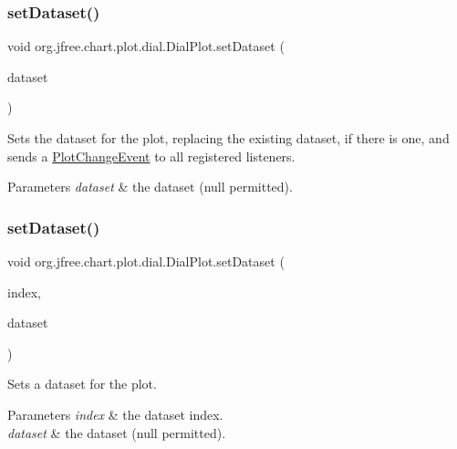 \subsubsection{\texorpdfstring{set\+Dataset()}{setDataset()}\hspace{0.1cm}{\footnotesize\ttfamily [1/2]}}
{\footnotesize\ttfamily void org.\+jfree.\+chart.\+plot.\+dial.\+Dial\+Plot.\+set\+Dataset (\begin{DoxyParamCaption}\item[{\mbox{\hyperlink{interfaceorg_1_1jfree_1_1data_1_1general_1_1_value_dataset}{Value\+Dataset}}}]{dataset }\end{DoxyParamCaption})}

Sets the dataset for the plot, replacing the existing dataset, if there is one, and sends a \mbox{\hyperlink{}{Plot\+Change\+Event}} to all registered listeners.


\begin{DoxyParams}{Parameters}
{\em dataset} & the dataset ({\ttfamily null} permitted). \\
\hline
\end{DoxyParams}
\mbox{\label{classorg_1_1jfree_1_1chart_1_1plot_1_1dial_1_1_dial_plot_acb78f99791020bfbf09b7e3e0c1dad45}} 
\subsubsection{\texorpdfstring{set\+Dataset()}{setDataset()}\hspace{0.1cm}{\footnotesize\ttfamily [2/2]}}
{\footnotesize\ttfamily void org.\+jfree.\+chart.\+plot.\+dial.\+Dial\+Plot.\+set\+Dataset (\begin{DoxyParamCaption}\item[{int}]{index,  }\item[{\mbox{\hyperlink{interfaceorg_1_1jfree_1_1data_1_1general_1_1_value_dataset}{Value\+Dataset}}}]{dataset }\end{DoxyParamCaption})}

Sets a dataset for the plot.


\begin{DoxyParams}{Parameters}
{\em index} & the dataset index. \\
\hline
{\em dataset} & the dataset ({\ttfamily null} permitted). \\
\hline
\end{DoxyParams}
\mbox{\label{classorg_1_1jfree_1_1chart_1_1plot_1_1dial_1_1_dial_plot_a02b28d69fba2ec6dfa3420b29213f51d}} 
